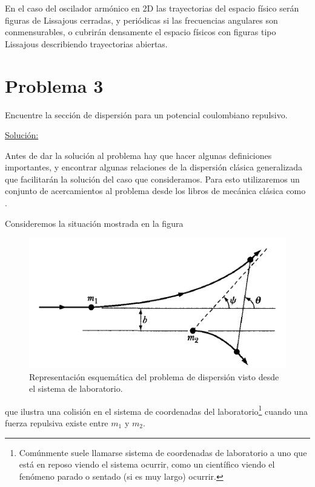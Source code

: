 \documentclass[a4paper,10pt]{article}
\numberwithin{equation}{section}
\begin{document}
\vspace{.3cm}

En el caso del oscilador armónico en 2D las trayectorias del espacio físico
serán figuras de Lissajous cerradas, y periódicas si las frecuencias angulares
son conmensurables, o cubrirán densamente el espacio físicos con figuras
tipo Lissajous describiendo trayectorias abiertas.

\section{Problema 3}

Encuentre la sección de dispersión para un potencial coulombiano repulsivo.

\vspace{.3cm}

\underline{Solución:} \vspace{.3cm}

Antes de dar la solución al problema hay que hacer algunas definiciones importantes, y
encontrar algunas relaciones de la dispersión clásica generalizada que facilitarán
la solución del caso que consideramos. Para esto utilizaremos un conjunto de 
acercamientos al problema desde los libros de mecánica clásica como
\cite{marion, goldstein}.

\vspace{.3cm}

Consideremos la situación mostrada en la figura 

\begin{figure}[H]
 \center
 \includegraphics[scale=0.5]{problema3fig1}
 \caption{Representación esquemática del problema de dispersión visto desde 
 el sistema de laboratorio.}
 \label{fig:problema3fig1}
\end{figure}

que ilustra una colisión en el sistema de coordenadas del laboratorio\footnote{Comúnmente 
suele llamarse sistema de coordenadas de laboratorio a uno que está en reposo
viendo el sistema ocurrir, como un científico viendo el fenómeno parado 
o sentado (si es muy largo) ocurrir.} cuando una fuerza repulsiva existe 
entre $m_1$ y $m_2$. 
\end{document}
